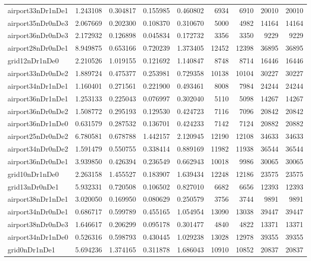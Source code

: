 \begin{longtable}{|l|r|r|r|r|r|r|r|r|}
airport33nDr1nDe1 & 1.243108 & 0.304817 & 0.155985 & 0.460802 & 6934 & 6910 & 20010 & 20010 \\
airport35nDr0nDe3 & 2.067669 & 0.202300 & 0.108370 & 0.310670 & 5000 & 4982 & 14164 & 14164 \\
airport36nDr0nDe3 & 2.172932 & 0.126898 & 0.045834 & 0.172732 & 3356 & 3350 & 9229 & 9229 \\
airport28nDr0nDe1 & 8.949875 & 0.653166 & 0.720239 & 1.373405 & 12452 & 12398 & 36895 & 36895 \\
grid12nDr1nDe0 & 2.210526 & 1.019155 & 0.121692 & 1.140847 & 8748 & 8714 & 16446 & 16446 \\
airport33nDr0nDe2 & 1.889724 & 0.475377 & 0.253981 & 0.729358 & 10138 & 10104 & 30227 & 30227 \\
airport34nDr1nDe1 & 1.160401 & 0.271561 & 0.221900 & 0.493461 & 8008 & 7984 & 24244 & 24244 \\
airport36nDr1nDe1 & 1.253133 & 0.225043 & 0.076997 & 0.302040 & 5110 & 5098 & 14267 & 14267 \\
airport36nDr0nDe2 & 1.508772 & 0.295193 & 0.129530 & 0.424723 & 7116 & 7096 & 20842 & 20842 \\
airport36nDr1nDe0 & 0.631579 & 0.287532 & 0.136701 & 0.424233 & 7142 & 7124 & 20882 & 20882 \\
airport25nDr0nDe2 & 6.780581 & 0.678788 & 1.442157 & 2.120945 & 12190 & 12108 & 34633 & 34633 \\
airport34nDr0nDe2 & 1.591479 & 0.550755 & 0.338414 & 0.889169 & 11982 & 11938 & 36544 & 36544 \\
airport36nDr0nDe1 & 3.939850 & 0.426394 & 0.236549 & 0.662943 & 10018 & 9986 & 30065 & 30065 \\
grid10nDr1nDe0 & 2.263158 & 1.455527 & 0.183907 & 1.639434 & 12248 & 12186 & 23575 & 23575 \\
grid13nDr0nDe1 & 5.932331 & 0.720508 & 0.106502 & 0.827010 & 6682 & 6656 & 12393 & 12393 \\
airport38nDr1nDe1 & 3.020050 & 0.169950 & 0.080629 & 0.250579 & 3756 & 3744 & 9891 & 9891 \\
airport34nDr0nDe1 & 0.686717 & 0.599789 & 0.455165 & 1.054954 & 13090 & 13038 & 39447 & 39447 \\
airport38nDr0nDe3 & 1.646617 & 0.206299 & 0.095178 & 0.301477 & 4840 & 4822 & 13371 & 13371 \\
airport34nDr1nDe0 & 0.526316 & 0.598793 & 0.430445 & 1.029238 & 13028 & 12978 & 39355 & 39355 \\
grid0nDr1nDe1 & 5.694236 & 1.374165 & 0.311878 & 1.686043 & 10910 & 10852 & 20837 & 20837 \\

\end{longtable}
